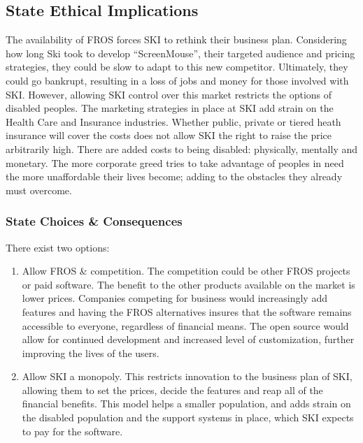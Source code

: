 \subsection{State Ethical Implications}
The availability of FROS forces SKI to rethink their business plan. Considering how long Ski took to develop ``ScreenMouse'', their targeted audience and pricing strategies, they could be slow to adapt to this new competitor. Ultimately, they could go bankrupt, resulting in a loss of jobs and money for those involved with SKI. However, allowing SKI control over this market restricts the options of disabled peoples. The marketing strategies in place at SKI add strain on the Health Care and Insurance industries. Whether public, private or tiered heath insurance will cover the costs does not allow SKI the right to raise the price arbitrarily high. There are added costs to being disabled: physically, mentally and monetary. The more corporate greed tries to take advantage of peoples in need the more unaffordable their lives become; adding to the obstacles they already must overcome.
\subsubsection{State Choices \& Consequences}
There exist two options:
\begin{enumerate}
\item 
Allow FROS \& competition. The competition could be other FROS projects or paid software. The benefit to the other products available on the market is lower prices. Companies competing for business would increasingly add features and having the FROS alternatives insures that the software remains accessible to everyone, regardless of financial means. The open source would allow for continued development and increased level of customization, further improving the lives of the users. 
\item 
Allow SKI a monopoly. This restricts innovation to the business plan of SKI, allowing them to set the prices, decide the features and reap all of the financial benefits. This model helps a smaller population, and adds strain on the disabled population and the support systems in place, which SKI expects to pay for the software.
\end{enumerate}